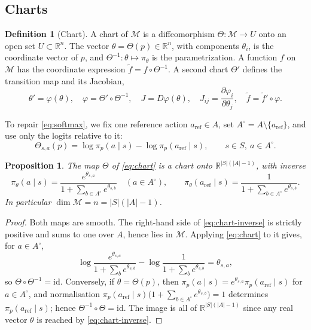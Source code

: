 \documentclass[11pt,a4paper]{article}
\numberwithin{equation}{section}
\theoremstyle{plain}
\newtheorem{proposition}[theorem]{Proposition}
\theoremstyle{definition}
\newtheorem{definition}[theorem]{Definition}
\theoremstyle{remark}
\newcommand{\R}{\mathbb{R}}
\newcommand{\aref}{a_{\mathrm{ref}}}
\newcommand{\Ao}{A^{\circ}}
\newcommand{\mani}{\mathcal{M}}
\begin{document}
\subsection{Charts}

\begin{definition}[Chart]\label{def:chart}
A chart of $\mani$ is a diffeomorphism $\Theta:\mani\to U$ onto an open set $U\subset\R^n$. The vector
$\theta=\Theta(p)\in\R^n$, with components $\theta_i$, is the coordinate vector of $p$, and
$\Theta^{-1}:\theta\mapsto\pi_\theta$ is the parametrization. A function $f$ on $\mani$ has the coordinate expression
$\tilde f=f\circ\Theta^{-1}$. A second chart $\Theta'$ defines the transition map and its Jacobian,
\begin{equation}\label{eq:transition}
  \theta'=\varphi(\theta),\quad \varphi=\Theta'\circ\Theta^{-1},\quad
  J=D\varphi(\theta),\quad J_{ij}=\frac{\partial\varphi_i}{\partial\theta_j},\quad
  \tilde f=\tilde f'\circ\varphi.
\end{equation}
\end{definition}

To repair \eqref{eq:softmax}, we fix one reference action $\aref\in A$, set $\Ao=A\setminus\{\aref\}$, and use only the logits
relative to it:
\begin{equation}\label{eq:chart}
  \Theta_{s,a}(p)=\log\pi_p(a\mid s)-\log\pi_p(\aref\mid s),\qquad s\in S,\ a\in\Ao .
\end{equation}

\begin{proposition}\label{prop:chart}
The map $\Theta$ of \eqref{eq:chart} is a chart onto $\R^{|S|(|A|-1)}$, with inverse
\begin{equation}\label{eq:chart-inverse}
  \pi_\theta(a\mid s)=\frac{e^{\theta_{s,a}}}{1+\sum_{b\in\Ao}e^{\theta_{s,b}}}\quad(a\in\Ao),
  \qquad
  \pi_\theta(\aref\mid s)=\frac{1}{1+\sum_{b\in\Ao}e^{\theta_{s,b}}} .
\end{equation}
In particular $\dim\mani=n=|S|(|A|-1)$.
\end{proposition}

\begin{proof}
Both maps are smooth. The right-hand side of \eqref{eq:chart-inverse} is strictly positive and sums to one over $A$, hence
lies in $\mani$. Applying \eqref{eq:chart} to it gives, for $a\in\Ao$,
\[
  \log\frac{e^{\theta_{s,a}}}{1+\sum_{b}e^{\theta_{s,b}}}-\log\frac{1}{1+\sum_{b}e^{\theta_{s,b}}}=\theta_{s,a},
\]
so $\Theta\circ\Theta^{-1}=\mathrm{id}$. Conversely, if $\theta=\Theta(p)$, then $\pi_p(a\mid s)=e^{\theta_{s,a}}\pi_p(\aref\mid s)$ for $a\in\Ao$, and
normalisation $\pi_p(\aref\mid s)\bigl(1+\sum_{b\in\Ao}e^{\theta_{s,b}}\bigr)=1$ determines $\pi_p(\aref\mid s)$; hence
$\Theta^{-1}\circ\Theta=\mathrm{id}$. The image is all of $\R^{|S|(|A|-1)}$ since any real vector $\theta$ is reached by \eqref{eq:chart-inverse}.
\end{proof}
\end{document}
